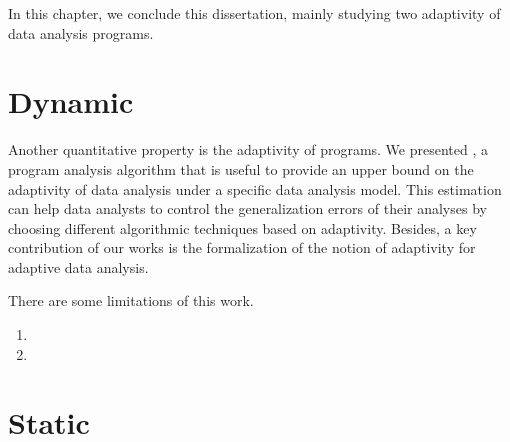 In this chapter, we conclude this dissertation, mainly studying two adaptivity of data analysis programs.


 
 \section{Dynamic}
 
 Another quantitative property is the adaptivity of programs. We presented {\ADAPTSYSTEM}, 
 a program analysis algorithm that is useful to provide an upper bound on the adaptivity of data analysis under a specific data analysis model. 
 This estimation can help data analysts to control the generalization errors of their analyses by choosing different algorithmic techniques based on adaptivity. 
 Besides, a key contribution of our works is the formalization of the notion of adaptivity for adaptive data analysis. 

 There are some limitations of this work. 
 \begin{enumerate}
     \item 
     
     \item 
 \end{enumerate}
 
 \section{Static}
